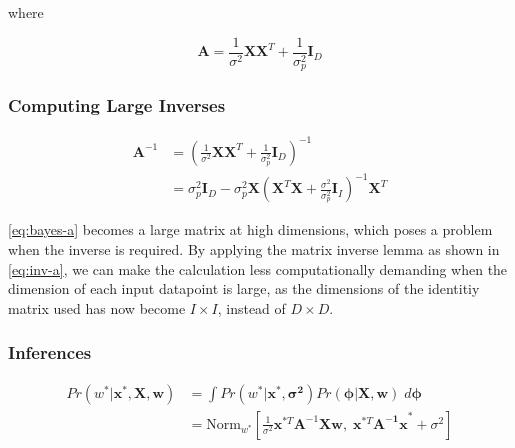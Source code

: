 \documentclass[11pt,openright,a4paper]{article}
\numberwithin{equation}{section}
\begin{document}
where

\begin{equation} \label{eq:bayes-a}
    \mathbf{A} = \frac{1}{\sigma^2} \mathbf{X X}^T + \frac{1}{\sigma_p^2}\mathbf{I}_D
\end{equation}

\subsubsection{Computing Large Inverses}

\begin{equation} \label{eq:inv-a}
    \begin{aligned}
        \mathbf{A}^{-1} &=
        \left ( \frac{1}{\sigma^2} \mathbf{X X}^T + \frac{1}{\sigma_p^2}\mathbf{I}_D \right )^{-1}
        \\
        &=  \sigma_p^2 \mathbf{I}_D -
            \sigma_p^2 \mathbf{X}
            \left ( \mathbf{X}^T\mathbf{X} + 
                \frac{\sigma^2}{\sigma_p^2} \mathbf{I}_I \right )^{-1}
            \mathbf{X}^T
    \end{aligned}
\end{equation}

\autoref{eq:bayes-a} becomes a large matrix at high dimensions, which poses a problem when the inverse is required. By applying the matrix inverse lemma as shown in \autoref{eq:inv-a}, we can make the calculation less computationally demanding when the dimension of each input datapoint is large, as the dimensions of the identitiy matrix used has now become $I \times I$, instead of $D \times D$.

\subsubsection{Inferences}

\begin{equation} \label{eq:inference}
    \begin{aligned}
        Pr \left ( w^* | \mathbf{x}^*, \mathbf{X}, \mathbf{w}  \right )
        &=
        \int Pr \left ( w^*|\mathbf{x}^*, \mathbf{\sigma^2} \right )
             Pr \left ( \boldsymbol\phi | \mathbf{X}, \mathbf{w} \right ) 
        \; d \boldsymbol\phi
        \\
        &= \text{Norm}_{w^*} \left [
           \frac{1}{\sigma^2} \mathbf{x}^{*T} \mathbf{A}^{-1} \mathbf{X w}, \;
           \mathbf{x}^{*T} \mathbf{A^{-1}x}^* + \sigma^2
           \right ]
    \end{aligned}
\end{equation}
\end{document}
